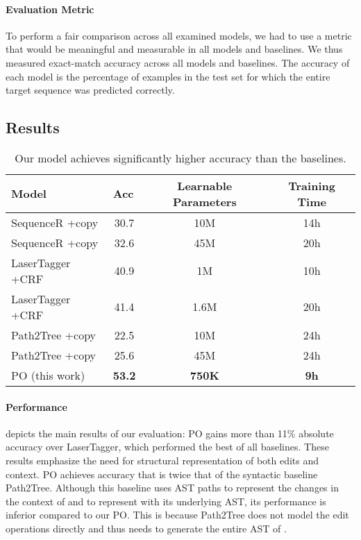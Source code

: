\paragraph{Evaluation Metric}
To perform a fair comparison across all examined models, we had to use a metric that would be meaningful and measurable in all models and baselines. 
We thus measured exact-match accuracy across all models and baselines.
The accuracy of each model is the percentage of examples in the test set for which
the entire target sequence was predicted correctly. 

\subsection{Results}
\begin{table}[t]
\small
\begin{tabular}{lccc}
\toprule
\multicolumn{1}{l}{\bf Model} &\multicolumn{1}{l}{\bf Acc} & \textbf{Learnable Parameters}  & \textbf{Training Time} 
\\ 
\midrule
SequenceR \citep{DBLP:journals/corr/abs-1901-01808} +copy &30.7 & 10M & 14h\\
SequenceR \citep{DBLP:journals/corr/abs-1901-01808} +copy &32.6  &45M &20h\\
LaserTagger \cite{malmi2019lasertagger} +CRF &40.9 & 1M & 10h\\
LaserTagger \cite{malmi2019lasertagger} +CRF &41.4 &1.6M & 20h\\
Path2Tree \cite{aharoni-goldberg-2017-towards} +copy &22.5 & 10M & 24h\\
Path2Tree \cite{aharoni-goldberg-2017-towards} +copy &25.6  & 45M & 24h\\
\midrule
\ctc{}PO (this work)  &\textbf{53.2} & \textbf{750K}  & \textbf{9h}\\
\bottomrule

\end{tabular}
\caption{Our model achieves significantly higher accuracy than the baselines.}
\label{Ti:results}
\end{table}

 
\paragraph{Performance}
 depicts the main results of our evaluation: \ctc{}PO gains more than 11\% absolute accuracy over LaserTagger, which performed the best of all baselines. 
These results emphasize the need for structural representation of both edits and context. \ctc{}PO achieves accuracy that is twice that of the syntactic baseline Path2Tree. Although this baseline uses AST paths to represent the changes in the context of  and to represent  with its underlying AST, its performance is inferior compared to our \ctc{}PO. This is because Path2Tree does not model the edit operations directly and thus needs to generate the entire AST of . 


